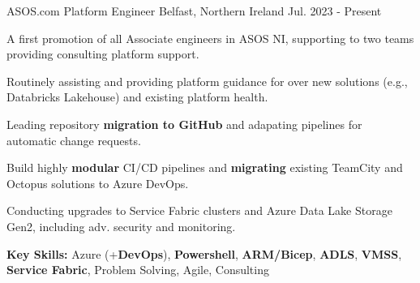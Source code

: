 \begin{cventries}

  \cventry
  	{ASOS.com} %
    {Platform Engineer} %
    {Belfast, Northern Ireland} %
    {Jul. 2023 - Present} %
    {
    \begin{cvitems}
		\item {A first promotion of all Associate engineers in ASOS NI, supporting to two teams providing consulting platform support.}
		\item {Routinely assisting and providing platform guidance for over new solutions (e.g., Databricks Lakehouse) and existing platform health.}
		\item {Leading repository \textbf{migration to GitHub} and adapating pipelines for automatic change requests.}
		\item {Build highly \textbf{modular} CI/CD pipelines and \textbf{migrating} existing TeamCity and Octopus solutions to Azure DevOps.}
    \item {Conducting upgrades to Service Fabric clusters and Azure Data Lake Storage Gen2, including adv. security and monitoring.}
    \item {\textbf{Key Skills:} Azure (+\textbf{DevOps}), \textbf{Powershell}, \textbf{ARM/Bicep}, \textbf{ADLS}, \textbf{VMSS}, \textbf{Service Fabric}, Problem Solving, Agile, Consulting}
     \end{cvitems}
    }


\end{cventries}
